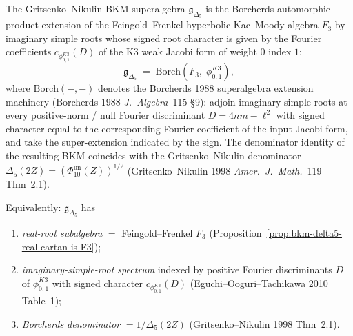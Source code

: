 \begin{theorem}
\label{thm:bkm-delta5-is-borch-F3}
The Gritsenko--Nikulin BKM superalgebra $\mathfrak{g}_{\Delta_5}$ is
the Borcherds automorphic-product extension of the Feingold--Frenkel
hyperbolic Kac--Moody algebra $F_3$ by imaginary simple roots whose
signed root character is given by the Fourier coefficients
$c_{\phi_{0,1}^{K3}}(D)$ of the K3 weak Jacobi form of weight $0$
index $1$:
\begin{equation}
\label{eq:bkm-delta5-borch-F3}
 \boxed{\;\mathfrak{g}_{\Delta_5}
 \;=\;\mathrm{Borch}\!\left(F_3,\;\phi_{0,1}^{K3}\right),\;}
\end{equation}
where
$\mathrm{Borch}(-, -)$ denotes the Borcherds 1988 superalgebra
extension machinery (Borcherds 1988 \emph{J.\ Algebra}~115 \S9):
adjoin imaginary simple roots at every positive-norm / null Fourier
discriminant $D = 4nm - \ell^2$ with signed character equal to the
corresponding Fourier coefficient of the input Jacobi form, and take
the super-extension indicated by the sign. The denominator identity
of the resulting BKM coincides with the Gritsenko--Nikulin
denominator
\(\Delta_5(2Z) = (\Phi_{10}^{\mathrm{un}}(Z))^{1/2}\)
(Gritsenko--Nikulin 1998 \emph{Amer.\ J.\ Math.}~119 Thm~2.1).

Equivalently: $\mathfrak{g}_{\Delta_5}$ has
\begin{enumerate}[label=\textup{(\roman*)}]
\item \emph{real-root subalgebra} $=$ Feingold--Frenkel $F_3$
 (Proposition~\ref{prop:bkm-delta5-real-cartan-is-F3});
\item \emph{imaginary-simple-root spectrum} indexed by positive
 Fourier discriminants $D$ of $\phi_{0,1}^{K3}$ with signed character
 $c_{\phi_{0,1}^{K3}}(D)$ (Eguchi--Ooguri--Tachikawa 2010 Table~1);
\item \emph{Borcherds denominator} $= 1/\Delta_5(2Z)$
 (Gritsenko--Nikulin 1998 Thm~2.1).
\end{enumerate}

\medskip


\end{theorem}
